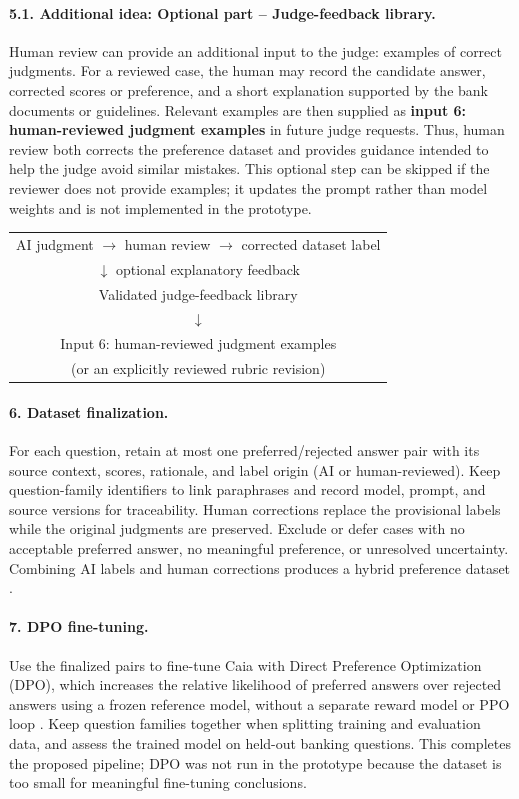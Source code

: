 \documentclass[11pt]{article}
\begin{document}
\paragraph{5.1. Additional idea: Optional part -- Judge-feedback library.}
Human review can provide an additional input to the judge: examples of correct judgments. For a reviewed case, the human may record the candidate answer, corrected scores or preference, and a short explanation supported by the bank documents or guidelines. Relevant examples are then supplied as \textbf{input 6: human-reviewed judgment examples} in future judge requests. Thus, human review both corrects the preference dataset and provides guidance intended to help the judge avoid similar mistakes. This optional step can be skipped if the reviewer does not provide examples; it updates the prompt rather than model weights and is not implemented in the prototype.

\begin{center}
\begin{tabular}{c}
AI judgment $\rightarrow$ human review $\rightarrow$ corrected dataset label\\
\hspace{1em}$\downarrow$ optional explanatory feedback\\
Validated judge-feedback library\\ $\downarrow$\\
Input 6: human-reviewed judgment examples\\
(or an explicitly reviewed rubric revision)
\end{tabular}
\end{center}

\paragraph{6. Dataset finalization.}
For each question, retain at most one preferred/rejected answer pair with its source context, scores, rationale, and label origin (AI or human-reviewed). Keep question-family identifiers to link paraphrases and record model, prompt, and source versions for traceability. Human corrections replace the provisional labels while the original judgments are preserved. Exclude or defer cases with no acceptable preferred answer, no meaningful preference, or unresolved uncertainty. Combining AI labels and human corrections produces a hybrid preference dataset \cite{cai,west}.

\paragraph{7. DPO fine-tuning.}
Use the finalized pairs to fine-tune Caia with Direct Preference Optimization (DPO), which increases the relative likelihood of preferred answers over rejected answers using a frozen reference model, without a separate reward model or PPO loop \cite{dpo}. Keep question families together when splitting training and evaluation data, and assess the trained model on held-out banking questions. This completes the proposed pipeline; DPO was not run in the prototype because the dataset is too small for meaningful fine-tuning conclusions.
\end{document}
